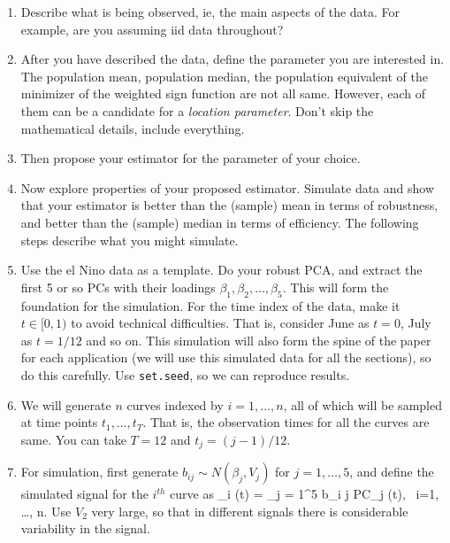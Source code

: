 \documentclass[12pt,letterpaper]{article}
\def\ban#1\ean{\begin{align*}#1\end{align*}}
\def\bredbf#1\eredbf{{\color{red}{\bf ???? #1 ????}}}
\theoremstyle{Example}
\begin{document}
\begin{enumerate}

\item 
Describe what is being observed, ie, the main aspects of the data. For example, are 
you assuming iid data throughout?

\item 
After you have described the data, define the parameter you are interested in. 
The population mean, population median, 
the population equivalent of the minimizer of the weighted sign function are not all 
same. However, each of them can be a candidate for a {\it location parameter}. Don't skip 
the mathematical details, include everything.

\item 
Then propose your estimator for the parameter of your choice. 

\item 
Now explore properties of your proposed estimator. Simulate data and show that 
your estimator is better than the (sample) mean in terms of robustness, and 
better than the (sample) median in terms of efficiency. The following steps 
describe what you might simulate.

\item Use the el Nino data as a template. Do your robust PCA, and extract the first 
5 or so PCs with their loadings $\beta_{1}, \beta_{2}, \ldots, \beta_{5}$. This will form
the foundation for the simulation. For the time index of the data, make it $t \in [0, 1)$
to avoid technical difficulties. That is, consider June as $t = 0$, July as $t = 1/12$ and 
so on. This simulation will also form the spine of the paper for each application (we will use this simulated data for all the sections), so do this carefully. Use {\tt set.seed}, so we can reproduce results.

\item
We will generate $n$ curves indexed by $i = 1, \ldots, n$, 
all of which will be sampled at time points 
$t_{1}, \ldots, t_{T}$. That is, the observation times for all the curves are 
same. You can take $T = 12$ and $t_{j} = (j -1)/12$. 

\item 
For simulation, first generate $b_{i j} \sim N ( \beta_{j}, V_{j})$ for $j = 1, \ldots, 5$, 
and define the simulated signal for the $i^{th}$ curve as  
\ban 
\xi_{i}  (t) = \sum_{j = 1}^{5} b_{i j} PC_{j} (t), \ i=1, \ldots, n. 
\ean
Use $V_{2}$ very large, so that in different signals there is considerable variability 
in the signal. 


\end{enumerate}
\end{document}
